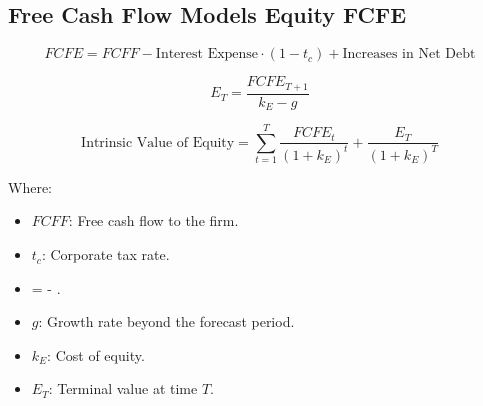 \documentclass[
]{book}
\providecommand{\tightlist}{%
  \setlength{\itemsep}{0pt}\setlength{\parskip}{0pt}}
\begin{document}
\hypertarget{free-cash-flow-models-equity-fcfe}{%
\subsection{Free Cash Flow Models Equity
FCFE}\label{free-cash-flow-models-equity-fcfe}}

\[
FCFE = FCFF - \text{Interest Expense} \cdot (1 - t_c) + \text{Increases in Net Debt}
\]

\[
E_T = \frac{FCFE_{T+1}}{k_E - g}
\]

\[
\text{Intrinsic Value of Equity} = \sum_{t=1}^{T} \frac{FCFE_t}{(1 + k_E)^t} + \frac{E_T}{(1 + k_E)^T}
\]

Where:

\begin{itemize}
\tightlist
\item
  \(FCFF\): Free cash flow to the firm.
\item
  \(t_c\): Corporate tax rate.
\item
   =  -
  .
\item
  \(g\): Growth rate beyond the forecast period.
\item
  \(k_E\): Cost of equity.
\item
  \(E_T\): Terminal value at time \(T\).
\end{itemize}
\end{document}
